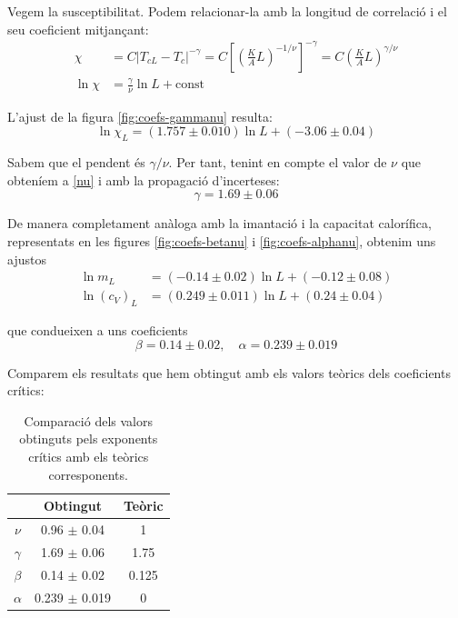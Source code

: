 \documentclass[a4paper]{article}
\begin{document}
Vegem la susceptibilitat. Podem relacionar-la amb la longitud de correlació i el seu coeficient mitjançant:
\begin{align*}
	\chi &= C \left|T_{cL}-T_c\right|^{-\gamma} = C \left[ \left(\frac{K}{A} L \right)^{-1/\nu} \right]^{-\gamma} = C \left(\frac{K}{A} L \right)^{\gamma/\nu} \\
	\ln \chi &= \frac{\gamma}{\nu} \ln L + \text{const}
\end{align*}

L'ajust de la figura \ref{fig:coefs-gammanu} resulta:
\begin{equation*}
	\ln \chi_L = (1.757 \pm 0.010) \ln L + (-3.06 \pm 0.04)
\end{equation*}

Sabem que el pendent és $\gamma/\nu$. Per tant, tenint en compte el valor de $\nu$ que obteníem a \eqref{nu} i amb la propagació d'incerteses:
\begin{equation*}
	\gamma = 1.69 \pm 0.06
\end{equation*}

De manera completament anàloga amb la imantació i la capacitat calorífica, representats en les figures \ref{fig:coefs-betanu} i \ref{fig:coefs-alphanu}, obtenim uns ajustos
\begin{align*}
	\ln m_L &= (-0.14 \pm 0.02) \ln L + (-0.12 \pm 0.08) \\
	\ln ({c_V})_L &= (0.249 \pm 0.011) \ln L + (0.24 \pm 0.04)
\end{align*}

que condueixen a uns coeficients
\begin{equation*}
	\beta = 0.14 \pm 0.02, \quad \alpha = 0.239 \pm 0.019
\end{equation*}

Comparem els resultats que hem obtingut amb els valors teòrics dels coeficients crítics:
\begin{table}[H]
\centering
\begin{tabular}{ccc}
\hline
\textbf{} & \textbf{Obtingut} & \textbf{Teòric} \\ \hline
$\nu$ & 0.96 $\pm$ 0.04 & 1 \\
$\gamma$ & 1.69 $\pm$ 0.06 & 1.75 \\
$\beta$ & 0.14 $\pm$ 0.02 & 0.125 \\
$\alpha$ & 0.239 $\pm$ 0.019 & 0
\end{tabular}
\caption{Comparació dels valors obtinguts pels exponents crítics amb els teòrics corresponents.}
\label{tab:critexp}
\end{table}
\end{document}
